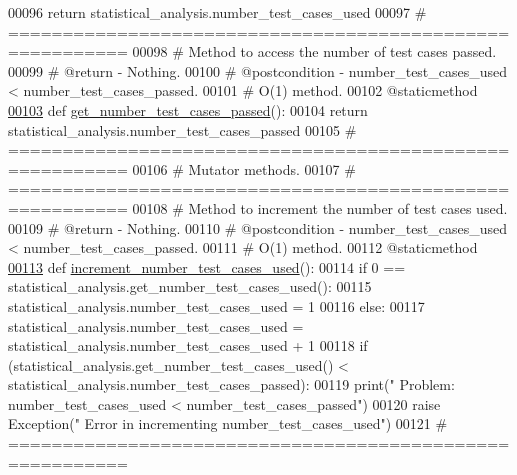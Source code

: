 \begin{DoxyCode}
00096         \textcolor{keywordflow}{return} statistical\_analysis.number\_test\_cases\_used
00097     \textcolor{comment}{# =========================================================}
00098     \textcolor{comment}{#   Method to access the number of test cases passed.}
00099     \textcolor{comment}{#   @return - Nothing.}
00100     \textcolor{comment}{#   @postcondition - number\_test\_cases\_used < number\_test\_cases\_passed.}
00101     \textcolor{comment}{#   O(1) method.}
00102     @staticmethod
\hypertarget{test__statistics_8py_source_l00103}{}\hyperlink{classstatistics_1_1test__statistics_1_1statistical__analysis_a0461b276e37fd6c24ab919efbeb04309}{00103}     \textcolor{keyword}{def }\hyperlink{classstatistics_1_1test__statistics_1_1statistical__analysis_a0461b276e37fd6c24ab919efbeb04309}{get\_number\_test\_cases\_passed}():
00104         \textcolor{keywordflow}{return} statistical\_analysis.number\_test\_cases\_passed
00105     \textcolor{comment}{# =========================================================}
00106     \textcolor{comment}{#   Mutator methods.}
00107     \textcolor{comment}{# =========================================================}
00108     \textcolor{comment}{#   Method to increment the number of test cases used.}
00109     \textcolor{comment}{#   @return - Nothing.}
00110     \textcolor{comment}{#   @postcondition - number\_test\_cases\_used < number\_test\_cases\_passed.}
00111     \textcolor{comment}{#   O(1) method.}
00112     @staticmethod
\hypertarget{test__statistics_8py_source_l00113}{}\hyperlink{classstatistics_1_1test__statistics_1_1statistical__analysis_a7e88e87c8e6739dcaa37740985089f11}{00113}     \textcolor{keyword}{def }\hyperlink{classstatistics_1_1test__statistics_1_1statistical__analysis_a7e88e87c8e6739dcaa37740985089f11}{increment\_number\_test\_cases\_used}():
00114         \textcolor{keywordflow}{if} 0 == statistical\_analysis.get\_number\_test\_cases\_used():
00115             statistical\_analysis.number\_test\_cases\_used = 1
00116         \textcolor{keywordflow}{else}:
00117             statistical\_analysis.number\_test\_cases\_used = statistical\_analysis.number\_test\_cases\_used + 1
00118         \textcolor{keywordflow}{if} (statistical\_analysis.get\_number\_test\_cases\_used() < 
      statistical\_analysis.number\_test\_cases\_passed):
00119             print(\textcolor{stringliteral}{" Problem: number\_test\_cases\_used < number\_test\_cases\_passed"})
00120             \textcolor{keywordflow}{raise} Exception(\textcolor{stringliteral}{"   Error in incrementing number\_test\_cases\_used"})
00121     \textcolor{comment}{# =========================================================}

\end{DoxyCode}
